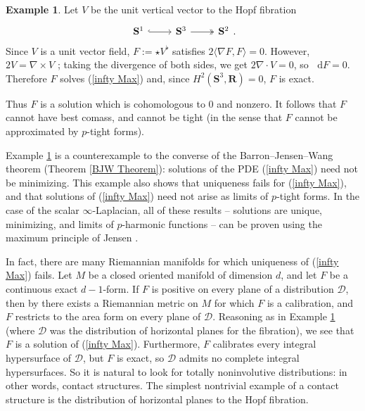 \documentclass[reqno,11pt]{amsart}
\newcommand{\RR}{\mathbf{R}}
\newcommand{\Sph}{\mathbf S}
\newcommand*\dif{\mathop{}\!\mathrm{d}}
\theoremstyle{definition}
\newtheorem{example}[theorem]{Example}
\numberwithin{equation}{section}
\begin{document}
\begin{example}\label{integrability needed}
Let $V$ be the unit vertical vector to the Hopf fibration%
\[\begin{tikzcd}
	{\mathbf S^1} & {\mathbf S^3} & {\mathbf S^2}
	\arrow[hook, from=1-1, to=1-2]
	\arrow[two heads, from=1-2, to=1-3]
\end{tikzcd}.\]
Since $V$ is a unit vector field, $F := \star V^\flat$ satisfies $2\langle \nabla F, F\rangle = 0$.
However, $2V = \nabla \times V$ \cite[\S3]{Peralta_Salas_2023}; taking the divergence of both sides, we get $2 \nabla \cdot V = 0$, so $\dif F = 0$.
Therefore $F$ solves (\ref{infty Max}) and, since $H^2(\Sph^3, \RR) = 0$, $F$ is exact.

Thus $F$ is a solution which is cohomologous to $0$ and nonzero.
It follows that $F$ cannot have best comass, and cannot be tight (in the sense that $F$ cannot be approximated by $p$-tight forms).
\end{example}

Example \ref{integrability needed} is a counterexample to the converse of the Barron--Jensen--Wang theorem (Theorem \ref{BJW Theorem}): solutions of the PDE (\ref{infty Max}) need not be minimizing.
This example also shows that uniqueness fails for (\ref{infty Max}), and that solutions of (\ref{infty Max}) need not arise as limits of $p$-tight forms.
In the case of the scalar $\infty$-Laplacian, all of these results -- solutions are unique, minimizing, and limits of $p$-harmonic functions -- can be proven using the maximum principle of Jensen \cite{Jensen1993}.

In fact, there are many Riemannian manifolds for which uniqueness of (\ref{infty Max}) fails.
Let $M$ be a closed oriented manifold of dimension $d$, and let $F$ be a continuous exact $d - 1$-form. 
If $F$ is positive on every plane of a distribution $\mathscr D$, then by \cite[Proposition 4.1]{bangert_cui_2017} there exists a Riemannian metric on $M$ for which $F$ is a calibration, and $F$ restricts to the area form on every plane of $\mathscr D$.
Reasoning as in Example \ref{integrability needed} (where $\mathscr D$ was the distribution of horizontal planes for the fibration), we see that $F$ is a solution of (\ref{infty Max}).
Furthermore, $F$ calibrates every integral hypersurface of $\mathscr D$, but $F$ is exact, so $\mathscr D$ admits no complete integral hypersurfaces.
So it is natural to look for totally noninvolutive distributions: in other words, contact structures.
The simplest nontrivial example of a contact structure is the distribution of horizontal planes to the Hopf fibration.
\end{document}
